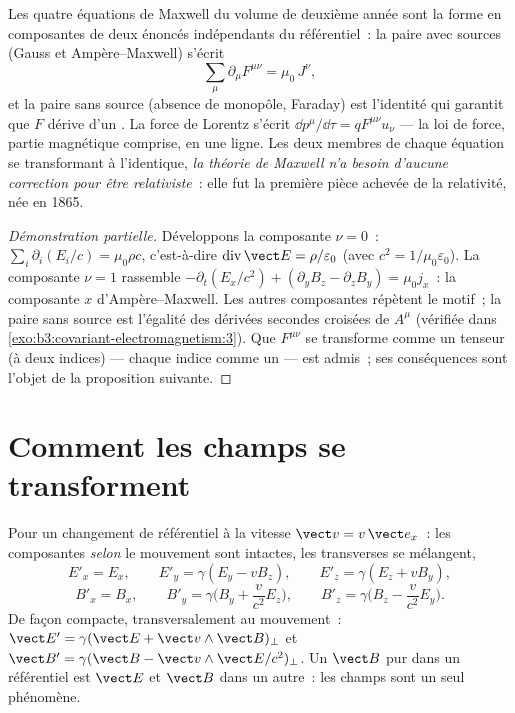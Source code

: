 \begin{theorem}\label{thm:b3:covariant-electromagnetism:maxwell}
Les quatre équations de Maxwell du volume de deuxième année sont la
forme en composantes de deux énoncés indépendants du référentiel~: la
paire avec sources (Gauss et Ampère--Maxwell) s'écrit
\[
\sum_\mu \partial_\mu F^{\mu\nu} = \mu_0\,J^\nu ,
\]
et la paire sans source (absence de monopôle, Faraday) est l'identité
qui garantit que $F$ dérive d'un . La force de Lorentz
s'écrit $\dd p^\mu/\dd\tau = qF^{\mu\nu}u_\nu$ --- la loi de force,
partie magnétique comprise, en une ligne. Les deux membres de chaque
équation se transformant à l'identique, \emph{la théorie de Maxwell
n'a besoin d'aucune correction pour être relativiste}~: elle fut la
première pièce achevée de la relativité, née en 1865.
\end{theorem}

\begin{proof}[Démonstration partielle]
Développons la composante $\nu = 0$~: $\sum_i\partial_i(E_i/c) =
\mu_0\rho c$, c'est-à-dire $\operatorname{div}\vect E = \rho/\varepsilon_0$
(avec $c^2 = 1/\mu_0\varepsilon_0$). La composante $\nu = 1$ rassemble $-\partial_t(E_x/c^2) + (\partial_yB_z - \partial_zB_y)
= \mu_0 j_x$~: la composante $x$ d'Ampère--Maxwell. Les autres
composantes répètent le motif~; la paire sans source est l'égalité des
dérivées secondes croisées de $A^\mu$ (vérifiée dans
\cref{exo:b3:covariant-electromagnetism:3}). Que $F^{\mu\nu}$ se
transforme comme un tenseur (à deux indices) --- chaque indice comme un
 --- est admis~; ses conséquences sont l'objet de la
proposition suivante.
\end{proof}

\section{Comment les champs se transforment}

\begin{proposition}\label{prop:b3:covariant-electromagnetism:transform}
Pour un changement de référentiel à la vitesse $\vect v = v\,\vect e_x$~:
les composantes \emph{selon} le mouvement sont intactes, les
transverses se mélangent,
\[
E'_x = E_x , \qquad
E'_y = \gamma(E_y - vB_z) , \qquad
E'_z = \gamma(E_z + vB_y) ,
\]
\[
B'_x = B_x , \qquad
B'_y = \gamma\Big(B_y + \frac{v}{c^2}E_z\Big) , \qquad
B'_z = \gamma\Big(B_z - \frac{v}{c^2}E_y\Big) .
\]
De façon compacte, transversalement au mouvement~: $\vect E' = \gamma(\vect E +
\vect v\wedge\vect B)_\perp$ et $\vect B' = \gamma(\vect B - \vect
v\wedge\vect E/c^2)_\perp$. Un $\vect B$ pur dans un référentiel est $\vect
E$ et $\vect B$ dans un autre~: les champs sont un seul phénomène.
\end{proposition}
\admitted

